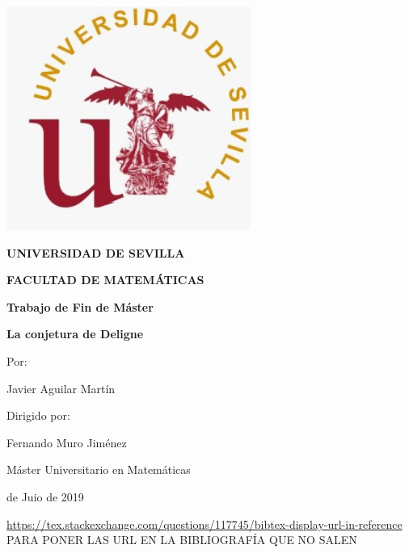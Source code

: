 \documentclass[twoside,11pt]{report}
\begin{document}
\begin{titlepage}
	\centering
		\includegraphics[width=8cm]{Imagenes/sello.jpeg}
		
	{\Large\bfseries UNIVERSIDAD DE SEVILLA\par}
	{\Large\bfseries FACULTAD DE MATEMÁTICAS\par}
	\vspace{0.5cm}
	{\large\bfseries Trabajo de Fin de Máster \par}
	\vspace{1cm}
	{\Huge\bfseries La conjetura de Deligne\par}
	\vspace{1cm}
	{\large Por:\par}
	{\large Javier Aguilar Martín\par}
	\vspace{0.5cm}
	{\large Dirigido por:\par}
	{\large Fernando Muro Jiménez\par}
	\vspace{1cm}
	{\large Máster Universitario en Matemáticas\par}
	\vspace{0.5cm}
	{\large  de Juio de 2019\par}
	\vspace{1cm}





	
\end{titlepage}



\tableofcontents

\url{https://tex.stackexchange.com/questions/117745/bibtex-display-url-in-reference} PARA PONER LAS URL EN LA BIBLIOGRAFÍA QUE NO SALEN

\end{document}
